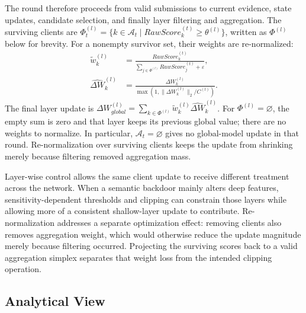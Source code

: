 \documentclass[conference,compsoc]{IEEEtran}
\begin{document}
The round therefore proceeds from valid submissions to current evidence, state updates, candidate selection, and finally layer filtering and aggregation. The surviving clients are $\Phi_t^{(l)}=\{k\in\mathcal A_t\mid RawScore_k^{(t)}\ge\theta^{(l)}\}$, written as $\Phi^{(l)}$ below for brevity. For a nonempty survivor set, their weights are re-normalized:
\begin{equation}
    \begin{aligned}
        \tilde{w}_{k}^{(l)}        & =\frac{RawScore_k^{(t)}}{\sum_{j\in\Phi^{(l)}}RawScore_j^{(t)}+\varepsilon}, \\
        \widehat{\Delta W}_k^{(l)} & =\frac{\Delta W_k^{(l)}}{\max(1,\|\Delta W_k^{(l)}\|_2/C^{(l)})}.
    \end{aligned}
\end{equation}
The final layer update is $\Delta W_{global}^{(l)}=\sum_{k\in\Phi^{(l)}}\tilde{w}_{k}^{(l)}\widehat{\Delta W}_k^{(l)}$. For $\Phi^{(l)}=\varnothing$, the empty sum is zero and that layer keeps its previous global value; there are no weights to normalize. In particular, $\mathcal A_t=\varnothing$ gives no global-model update in that round. Re-normalization over surviving clients keeps the update from shrinking merely because filtering removed aggregation mass.



Layer-wise control allows the same client update to receive different treatment across the network. When a semantic backdoor mainly alters deep features, sensitivity-dependent thresholds and clipping can constrain those layers while allowing more of a consistent shallow-layer update to contribute. Re-normalization addresses a separate optimization effect: removing clients also removes aggregation weight, which would otherwise reduce the update magnitude merely because filtering occurred. Projecting the surviving scores back to a valid aggregation simplex separates that weight loss from the intended clipping operation.

\subsection{Analytical View}
\end{document}
